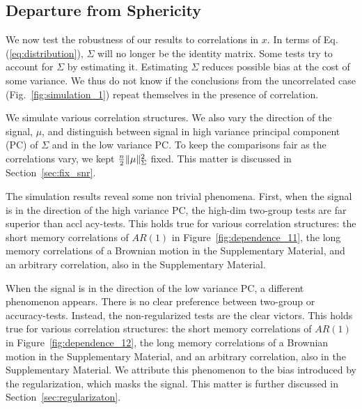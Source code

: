 \documentclass[oupdraft]{bio}
\begin{document}
\subsection{Departure from Sphericity}
\label{sec:dependence}

We now test the robustness of our results to correlations in $x$. 
In terms of Eq.(\ref{eq:distribution}), $\Sigma$ will no longer be the identity matrix. 
Some tests try to account for $\Sigma$ by estimating it. 
Estimating $\Sigma$ reduces possible bias at the cost of some variance. 
We thus do not know if the conclusions from the uncorrelated case (Fig.~\ref{fig:simulation_1}) repeat themselves in the presence of correlation. 

We simulate various correlation structures.
We also vary the direction of the signal, $\mu$, and distinguish between signal in high variance principal component (PC) of $\Sigma$ and in the low variance PC. 
To keep the comparisons fair as the correlations vary, we kept $\frac{n}{2}\Vert \mu \Vert^2_\Sigma$ fixed.
This matter is discussed in Section~\ref{sec:fix_snr}.


The simulation results reveal some non trivial phenomena.
First, when the signal is in the direction of the high variance PC, the high-dim two-group tests are far superior than accl
acy-tests. 
This holds true for various correlation structures: the short memory correlations of $AR(1)$ in Figure~\ref{fig:dependence_11}, the long memory correlations of a Brownian motion in the Supplementary Material, and an arbitrary correlation, also in the Supplementary Material.

When the signal is in the direction of the low variance PC, a different phenomenon appears.
There is no clear preference between two-group or accuracy-tests.
Instead, the non-regularized tests are the clear victors. 
This holds true for various correlation structures: the short memory correlations of $AR(1)$ in Figure~\ref{fig:dependence_12}, the long memory correlations of a Brownian motion in the Supplementary Material, and an arbitrary correlation, also in the Supplementary Material.
We attribute this phenomenon to the bias introduced by the regularization, which masks the signal.
This matter is further discussed in Section~\ref{sec:regularizaton}.
\end{document}
